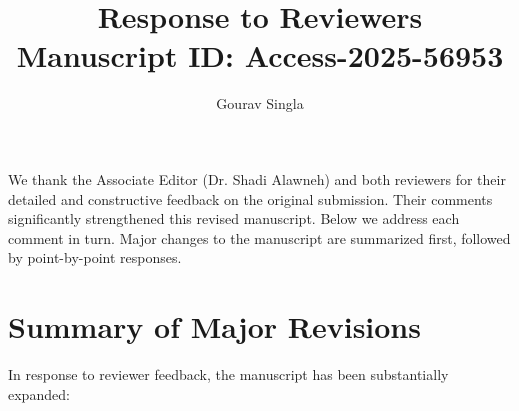 \documentclass[11pt]{article}
\title{Response to Reviewers\\Manuscript ID: Access-2025-56953}
\author{Gourav Singla}
\date{}
\begin{document}
\maketitle

We thank the Associate Editor (Dr. Shadi Alawneh) and both reviewers for their detailed and constructive feedback on the original submission. Their comments significantly strengthened this revised manuscript. Below we address each comment in turn. Major changes to the manuscript are summarized first, followed by point-by-point responses.

\section*{Summary of Major Revisions}

In response to reviewer feedback, the manuscript has been substantially expanded:
\end{document}
